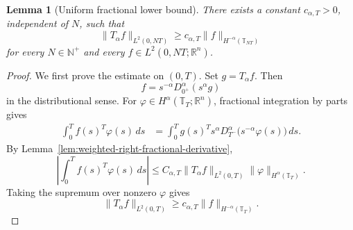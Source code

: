 \documentclass[preprint,12pt]{elsarticle}
\newtheorem{lemma}[theorem]{Lemma}
\theoremstyle{definition}
\theoremstyle{plain}
\begin{document}
\begin{lemma}[Uniform fractional lower bound]
\label{lem:uniform-fractional-lower-bound}
There exists a constant $c_{\alpha,T}>0$, independent of $N$, such that
\begin{equation}
\label{eq:uniform-fractional-lower-bound}
    \|T_\alpha f\|_{L^2(0,NT)}
    \geq
    c_{\alpha,T}
    \|f\|_{H^{-\alpha}(\mathbb T_{NT})}
\end{equation}
for every $N\in\mathbb N^+$ and every
$f\in L^2(0,NT;\mathbb R^n)$.
\end{lemma}

\begin{proof}
We first prove the estimate on $(0,T)$. Set $g=T_\alpha f$. Then
\begin{equation*}
    f
    =
    s^{-\alpha}
    D_{0^+}^{\alpha}(s^\alpha g)
\end{equation*}
in the distributional sense. For
$\varphi\in H^\alpha(\mathbb T_T;\mathbb R^n)$, fractional integration
by parts gives
\begin{align*}
    \int_0^T f(s)^T\varphi(s)\,ds
    &=
    \int_0^T
    g(s)^T
    s^\alpha
    D_{T^-}^{\alpha}
    \bigl(s^{-\alpha}\varphi(s)\bigr)\,ds.
\end{align*}
By Lemma~\ref{lem:weighted-right-fractional-derivative},
\begin{equation*}
    \left|
        \int_0^T f(s)^T\varphi(s)\,ds
    \right|
    \leq
    C_{\alpha,T}
    \|T_\alpha f\|_{L^2(0,T)}
    \|\varphi\|_{H^\alpha(\mathbb T_T)}.
\end{equation*}
Taking the supremum over nonzero $\varphi$ gives
\begin{equation}
\label{eq:fractional-lower-fixed}
    \|T_\alpha f\|_{L^2(0,T)}
    \geq
    c_{\alpha,T}
    \|f\|_{H^{-\alpha}(\mathbb T_T)}.
\end{equation}


\end{proof}
\end{document}
